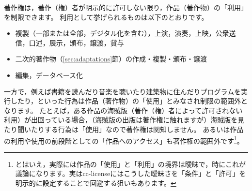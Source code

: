 \documentclass{ltjsarticle}
\begin{document}
著作権は，著作（権）者が明示的に許可しない限り，作品（著作物）の「利用」を制限できます。
利用として挙げられるものは以下のとおりです。
\begin{itemize}
\item 複製（一部または全部，デジタル化を含む），上演，演奏，上映，公衆送信，口述，展示，頒布，譲渡，貸与
\item 二次的著作物（\ref{sec:adaptations}節）の作成・複製・頒布・譲渡
\item 編集，データベース化
\end{itemize}

一方で，例えば書籍を読んだり音楽を聴いたり建築物に住んだりプログラムを実行したり，といった行為は作品（著作物）の「使用」とみなされ制限の範囲外となります。
たとえば，ある作品の海賊版（著作（権）者によって許可されない利用）が出回っている場合，（海賊版の出版は著作権に触れますが）海賊版を見たり聞いたりする行為は「使用」なので著作権は関知しません。
あるいは作品の利用や使用の前段階としての「作品へのアクセス」も著作権の範囲外です\footnote{とはいえ，実際には作品の「使用」と「利用」の境界は曖昧で，時にこれが議論になります。実はcc-licenseにはこうした曖昧さを「条件」と「許可」を明示的に設定することで回避する狙いもあります。}。
\end{document}
